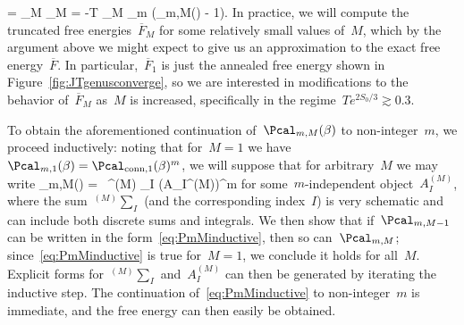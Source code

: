 \documentclass[12pt]{article}
\begin{document}
\be
{} = \lim_{M \to \infty} _M = -T \lim_{M \to \infty} \lim_{m }  \left(\Pcal_{m,M}(\beta) - 1\right).
\ee
In practice, we will compute the truncated free energies~$\overline{F}_M$ for some relatively small values of~$M$, which by the argument above we might expect to give us an approximation to the exact free energy~$\overline{F}$.  In particular,~$\overline{F}_1$ is just the annealed free energy shown in Figure~\ref{fig:JTgenusconverge}, so we are interested in modifications to the behavior of~$\overline{F}_M$ as~$M$ is increased, specifically in the regime~$T e^{2S_0/3} \gtrsim 0.3$.

To obtain the aforementioned continuation of~$\Pcal_{m,M}(\beta)$ to non-integer~$m$, we proceed inductively: noting that for~$M = 1$ we have~$\Pcal_{m,1}(\beta) = \Pcal_{\mathrm{conn},1}(\beta)^m$, we will suppose that for arbitrary~$M$ we may write
\be
\label{eq:PmMinductive}
\Pcal_{m,M}(\beta) = \, ^{(M)} \! \sum_I \left(A_I^{(M)}\right)^m
\ee
for some~$m$-independent object~$A_I^{(M)}$, where the sum~$^{(M)} \! \sum_I$ (and the corresponding index~$I$) is very schematic and can include both discrete sums and integrals.  We then show that if~$\Pcal_{m,M-1}$ can be written in the form~\eqref{eq:PmMinductive}, then so can~$\Pcal_{m,M}$; since~\eqref{eq:PmMinductive} is true for~$M = 1$, we conclude it holds for all~$M$.  Explicit forms for~$^{(M)} \sum_I$ and~$A_I^{(M)}$ can then be generated by iterating the inductive step.  The continuation of~\eqref{eq:PmMinductive} to non-integer~$m$ is immediate, and the free energy can then easily be obtained.
\end{document}
